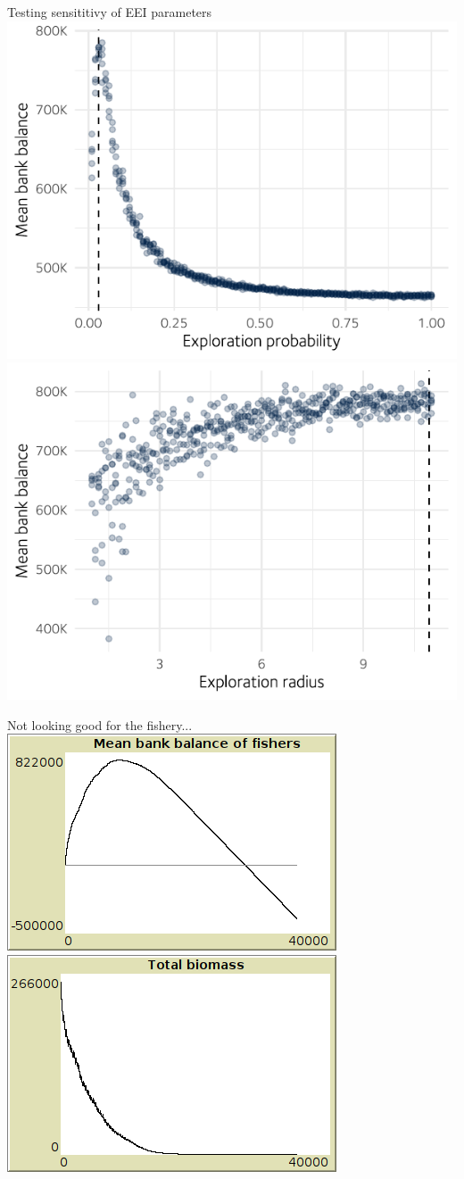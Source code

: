 \documentclass[table, 14pt, aspectratio=169]{beamer}
\begin{document}
\begin{frame}{Testing sensititivy of EEI parameters}
  \includegraphics[width=0.49\linewidth]{images/exploration_prob.pdf}
  \hfill
  \includegraphics[width=0.49\linewidth]{images/exploration_radius.pdf}
\end{frame}

\begin{frame}{Not looking good for the fishery...}
  \includegraphics[width=0.49\linewidth]{images/business-as-usual-balance.png}
  \hfill
  \includegraphics[width=0.49\linewidth]{images/business-as-usual-biomass.png}
\end{frame}
\end{document}
